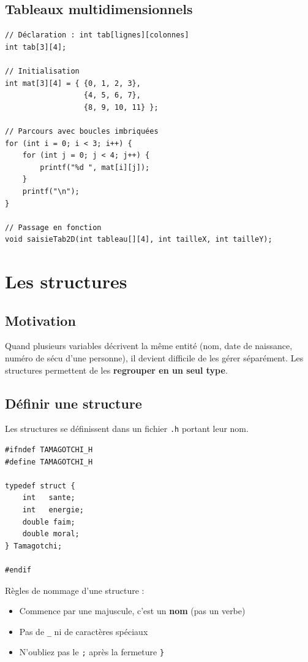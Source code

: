 \documentclass[12pt,a4paper]{article}
\begin{document}
\subsection{Tableaux multidimensionnels}

\begin{lstlisting}[caption={Tableau 2D}]
// Déclaration : int tab[lignes][colonnes]
int tab[3][4];

// Initialisation
int mat[3][4] = { {0, 1, 2, 3},
                  {4, 5, 6, 7},
                  {8, 9, 10, 11} };

// Parcours avec boucles imbriquées
for (int i = 0; i < 3; i++) {
    for (int j = 0; j < 4; j++) {
        printf("%d ", mat[i][j]);
    }
    printf("\n");
}

// Passage en fonction
void saisieTab2D(int tableau[][4], int tailleX, int tailleY);
\end{lstlisting}

\section{Les structures}

\subsection{Motivation}

Quand plusieurs variables décrivent la même entité (nom, date de naissance, numéro de sécu d'une personne), il devient difficile de les gérer séparément. Les structures permettent de les \textbf{regrouper en un seul type}.

\subsection{Définir une structure}

Les structures se définissent dans un fichier \texttt{.h} portant leur nom.

\begin{lstlisting}[caption={Tamagotchi.h}]
#ifndef TAMAGOTCHI_H
#define TAMAGOTCHI_H

typedef struct {
    int   sante;
    int   energie;
    double faim;
    double moral;
} Tamagotchi;

#endif
\end{lstlisting}

\begin{regle}
Règles de nommage d'une structure :
\begin{itemize}
    \item Commence par une majuscule, c'est un \textbf{nom} (pas un verbe)
    \item Pas de \texttt{\_} ni de caractères spéciaux
    \item N'oubliez pas le \texttt{;} après la fermeture \texttt{\}}
\end{itemize}
\end{regle}
\end{document}

